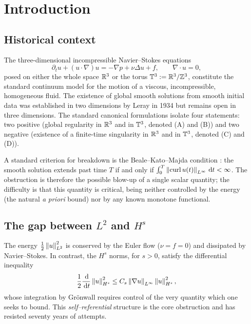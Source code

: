 \section{Introduction}\label{part-1:sec:intro}

\subsection{Historical context}
\label{part-1:ssec:historical}

The three-dimensional incompressible Navier--Stokes equations
\begin{equation}\label{part-1:eq:NS-physical}
\partial_t u + (u\cdot\nabla) u = -\nabla p + \nu \Delta u + f,
\qquad \nabla\cdot u = 0,
\end{equation}
posed on either the whole space $\mathbb{R}^3$ or the torus $\mathbb{T}^3 := \mathbb{R}^3/\mathbb{Z}^3$, 
constitute the standard continuum model for the motion of a viscous, 
incompressible, homogeneous fluid. The existence of global smooth 
solutions from smooth initial data was established in two dimensions by 
Leray in 1934 \cite{Leray1934} but remains open in three dimensions. The 
standard canonical formulations isolate four 
statements: two positive (global regularity in $\mathbb{R}^3$ and in $\mathbb{T}^3$, 
denoted (A) and (B)) and two negative (existence of a finite-time 
singularity in $\mathbb{R}^3$ and in $\mathbb{T}^3$, denoted (C) and (D)). 

A standard criterion for breakdown is the Beale--Kato--Majda condition 
\cite{BKM1984}: the smooth solution extends past time $T$ if and only if 
$\int_0^T \left\lVert \operatorname{curl} u(t) \right\rVert_{L^\infty}\,\mathrm{d} t < \infty$. The obstruction is 
therefore the possible blow-up of a single scalar quantity; the difficulty 
is that this quantity is critical, being neither controlled by the energy 
(the natural \emph{a priori} bound) nor by any known monotone functional.

\subsection{The gap between $L^2$ and $H^s$}
\label{part-1:ssec:gap}

The energy $\tfrac12\left\lVert u \right\rVert_{L^2}^2$ is conserved by the Euler flow 
($\nu = f = 0$) and dissipated by Navier--Stokes. In contrast, the 
$H^s$ norms, for $s>0$, satisfy the differential inequality
\begin{equation}\label{part-1:eq:Hs-inequality}
\frac{1}{2}\frac{\,\mathrm{d}}{\,\mathrm{d} t}\left\lVert u \right\rVert_{H^s}^2 
\leq C_s \left\lVert \nabla u \right\rVert_{L^\infty}\left\lVert u \right\rVert_{H^s}^2,
\end{equation}
whose integration by Gr\"onwall requires control of the very quantity 
which one seeks to bound. This \emph{self--referential} structure is the 
core obstruction and has resisted seventy years of attempts.

